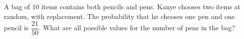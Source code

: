 A bag of $10$ items contains both pencils and pens. Kanye chooses two items at random, with replacement. The probability that he chooses one pen and one pencil is $\dfrac{21}{50}$. What are all possible values for the number of pens in the bag?
